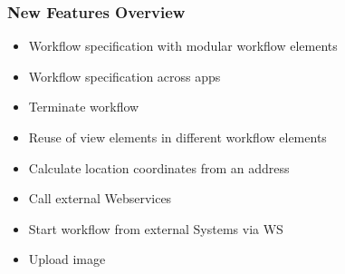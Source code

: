 
\begin{frame}
\frametitle{New Features Overview}

\begin{itemize}
\item Workflow specification with modular workflow elements
\item Workflow specification across apps
\item Terminate workflow
\item Reuse of view elements in different workflow elements
\item Calculate location coordinates from an address
\item Call external Webservices
\item Start workflow from external Systems via WS
\item Upload image
\end{itemize}
\end{frame}


